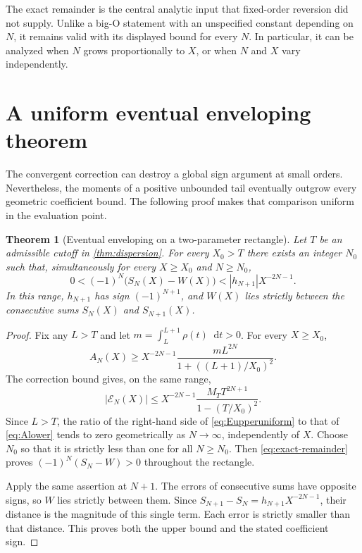 \documentclass[11pt,a4paper]{article}
\newtheorem{theorem}{Theorem}[section]
\theoremstyle{definition}
\numberwithin{equation}{section}
\newcommand{\dd}{\mathop{}\!\mathrm{d}}
\newcommand{\ctail}{\mathcal E}
\begin{document}
The exact remainder is the central analytic input that fixed-order
reversion did not supply. Unlike a big-O statement with an unspecified
constant depending on $N$, it remains valid with its displayed bound for
every $N$. In particular, it can be analyzed when $N$ grows proportionally
to $X$, or when $N$ and $X$ vary independently.

\section{A uniform eventual enveloping theorem}
\label{sec:enveloping}

The convergent correction can destroy a global sign argument at small
orders. Nevertheless, the moments of a positive unbounded tail eventually
outgrow every geometric coefficient bound. The following proof makes that
comparison uniform in the evaluation point.

\begin{theorem}[Eventual enveloping on a two-parameter rectangle]
\label{thm:enveloping}
Let $T$ be an admissible cutoff in \cref{thm:dispersion}. For every
$X_0>T$ there exists an integer $N_0$ such that, simultaneously for every
$X\ge X_0$ and $N\ge N_0$,
\begin{equation}
 0<(-1)^N\bigl(S_N(X)-W(X)\bigr)
        <|h_{N+1}|X^{-2N-1}.
 \label{eq:envelope}
\end{equation}
In this range, $h_{N+1}$ has sign $(-1)^{N+1}$, and $W(X)$ lies strictly
between the consecutive sums $S_N(X)$ and $S_{N+1}(X)$.
\end{theorem}
\begin{proof}
Fix any $L>T$ and let
$m=\int_L^{L+1}\rho(t)\dd t>0$. For every $X\ge X_0$,
\begin{equation}
 A_N(X)\ge X^{-2N-1}
       \frac{mL^{2N}}{1+((L+1)/X_0)^2}.
 \label{eq:Alower}
\end{equation}
The correction bound gives, on the same range,
\begin{equation}
 |\ctail_N(X)|\le X^{-2N-1}
       \frac{M_TT^{2N+1}}{1-(T/X_0)^2}.
 \label{eq:Eupperuniform}
\end{equation}
Since $L>T$, the ratio of the right-hand side of
\eqref{eq:Eupperuniform} to that of \eqref{eq:Alower} tends to zero
geometrically as $N\to\infty$, independently of $X$. Choose $N_0$ so
that it is strictly less than one for all $N\ge N_0$. Then
\eqref{eq:exact-remainder} proves
$(-1)^N(S_N-W)>0$ throughout the rectangle.

Apply the same assertion at $N+1$. The errors of consecutive sums have
opposite signs, so $W$ lies strictly between them. Since
$S_{N+1}-S_N=h_{N+1}X^{-2N-1}$, their distance is the magnitude of this
single term. Each error is strictly smaller than that distance.
This proves both the upper bound and the stated coefficient sign.
\end{proof}
\end{document}
